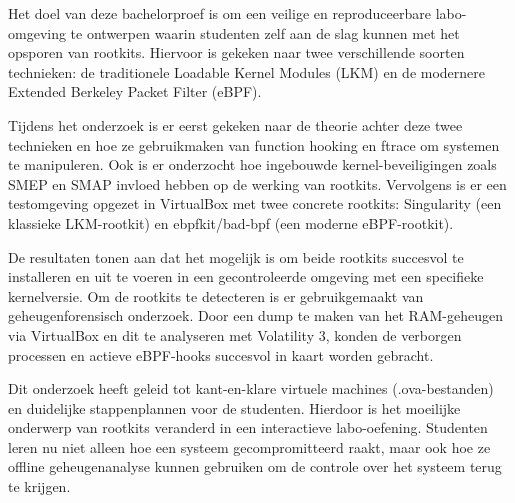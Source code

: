 Het doel van deze bachelorproef is om een veilige en reproduceerbare labo-omgeving te ontwerpen waarin studenten zelf aan de slag kunnen met het opsporen van rootkits. Hiervoor is gekeken naar twee verschillende soorten technieken: de traditionele Loadable Kernel Modules (LKM) en de modernere Extended Berkeley Packet Filter (eBPF). 

Tijdens het onderzoek is er eerst gekeken naar de theorie achter deze twee technieken en hoe ze gebruikmaken van function hooking en ftrace om systemen te manipuleren. Ook is er onderzocht hoe ingebouwde kernel-beveiligingen zoals SMEP en SMAP invloed hebben op de werking van rootkits. Vervolgens is er een testomgeving opgezet in VirtualBox met twee concrete rootkits: Singularity (een klassieke LKM-rootkit) en ebpfkit/bad-bpf (een moderne eBPF-rootkit). 

De resultaten tonen aan dat het mogelijk is om beide rootkits succesvol te installeren en uit te voeren in een gecontroleerde omgeving met een specifieke kernelversie. Om de rootkits te detecteren is er gebruikgemaakt van geheugenforensisch onderzoek. Door een dump te maken van het RAM-geheugen via VirtualBox en dit te analyseren met Volatility 3, konden de verborgen processen en actieve eBPF-hooks succesvol in kaart worden gebracht. 

Dit onderzoek heeft geleid tot kant-en-klare virtuele machines (.ova-bestanden) en duidelijke stappenplannen voor de studenten. Hierdoor is het moeilijke onderwerp van rootkits veranderd in een interactieve labo-oefening. Studenten leren nu niet alleen hoe een systeem gecompromitteerd raakt, maar ook hoe ze offline geheugenanalyse kunnen gebruiken om de controle over het systeem terug te krijgen.



